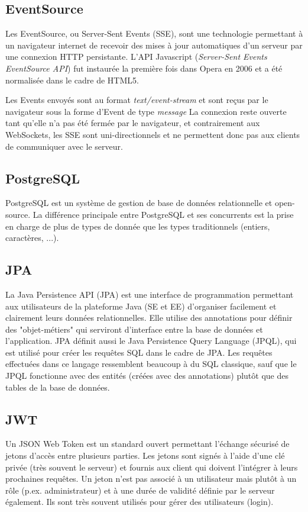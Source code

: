\documentclass[french]{article}
\begin{document}
\subsection{EventSource}
Les EventSource, ou Server-Sent Events (SSE), sont une technologie permettant à un navigateur internet de recevoir des mises à jour automatiques d'un serveur par une connexion HTTP persistante. L'API Javascript (\textit{Server-Sent Events EventSource API}) fut instaurée la première fois dans Opera en 2006 et a été normalisée dans le cadre de HTML5. \par
Les Events envoyés sont au format \textit{text/event-stream} et sont reçus par le navigateur sous la forme d'Event de type \textit{message} La connexion reste ouverte tant qu'elle n'a pas été fermée par le navigateur, et contrairement aux WebSockets, les SSE sont uni-directionnels et ne permettent donc pas aux clients de communiquer avec le serveur. 

\subsection{PostgreSQL}
PostgreSQL est un système de gestion de base de données relationnelle et open-source. La différence principale entre PostgreSQL et ses concurrents est la prise en charge de plus de types de donnée que les types traditionnels (entiers, caractères, ...).

\subsection{JPA}
La Java Persistence API (JPA) est une interface de programmation permettant aux utilisateurs de la plateforme Java (SE et EE) d'organiser facilement et clairement leurs données relationnelles. Elle utilise des annotations pour définir des "objet-métiers" qui serviront d'interface entre la base de données et l'application. \newline
JPA définit aussi le Java Persistence Query Language (JPQL), qui est utilisé pour créer les requêtes SQL dans le cadre de JPA. Les requêtes effectuées dans ce langage ressemblent beaucoup à du SQL classique, sauf que le JPQL fonctionne avec des entités (créées avec des annotations) plutôt que des tables de la base de données.

\subsection{JWT}
Un JSON Web Token est un standard ouvert permettant l'échange sécurisé de jetons d'accès entre plusieurs parties. Les jetons sont signés à l'aide d'une clé privée (très souvent le serveur) et fournis aux client qui doivent l'intégrer à leurs prochaines requêtes. Un jeton n'est pas associé à un utilisateur mais plutôt à un rôle (p.ex. administrateur) et à une durée de validité définie par le serveur également. Ils sont très souvent utilisés pour gérer des utilisateurs (login).
\end{document}
